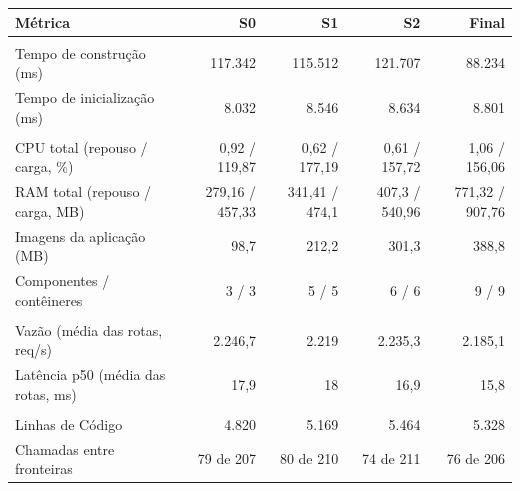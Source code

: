 \begin{quadro}[htb]
  \centering
  \caption{E-commerce --- métricas por snapshot --- Capacidade de Negócio.}
  \label{qua:comp_ecommerce_capacidade-negocio_snapshots}
  \renewcommand{\arraystretch}{1.15}
  \begin{tabularx}{\textwidth}{|>{\raggedright\arraybackslash}X|r|r|r|r|}
    \hline
    \textbf{Métrica} & \textbf{S0} & \textbf{S1} & \textbf{S2} & \textbf{Final} \\
    \hline
    \multicolumn{5}{|l|}{\textbf{Agilidade}} \\
    \hline
    Tempo de construção (ms) & 117.342 & 115.512 & 121.707 & 88.234 \\
    Tempo de inicialização (ms) & 8.032 & 8.546 & 8.634 & 8.801 \\
    \hline
    \multicolumn{5}{|l|}{\textbf{Custo}} \\
    \hline
    CPU total (repouso / carga, \%) & 0,92 / 119,87 & 0,62 / 177,19 & 0,61 / 157,72 & 1,06 / 156,06 \\
    RAM total (repouso / carga, MB) & 279,16 / 457,33 & 341,41 / 474,1 & 407,3 / 540,96 & 771,32 / 907,76 \\
    Imagens da aplicação (MB) & 98,7 & 212,2 & 301,3 & 388,8 \\
    Componentes / contêineres & 3 / 3 & 5 / 5 & 6 / 6 & 9 / 9 \\
    \hline
    \multicolumn{5}{|l|}{\textbf{Desempenho}} \\
    \hline
    Vazão (média das rotas, req/s) & 2.246,7 & 2.219 & 2.235,3 & 2.185,1 \\
    Latência p50 (média das rotas, ms) & 17,9 & 18 & 16,9 & 15,8 \\
    \hline
    \multicolumn{5}{|l|}{\textbf{Manutenibilidade}} \\
    \hline
    Linhas de Código & 4.820 & 5.169 & 5.464 & 5.328 \\
    Chamadas entre fronteiras & 79 de 207 & 80 de 210 & 74 de 211 & 76 de 206 \\
    \hline
  \end{tabularx}
\end{quadro}
